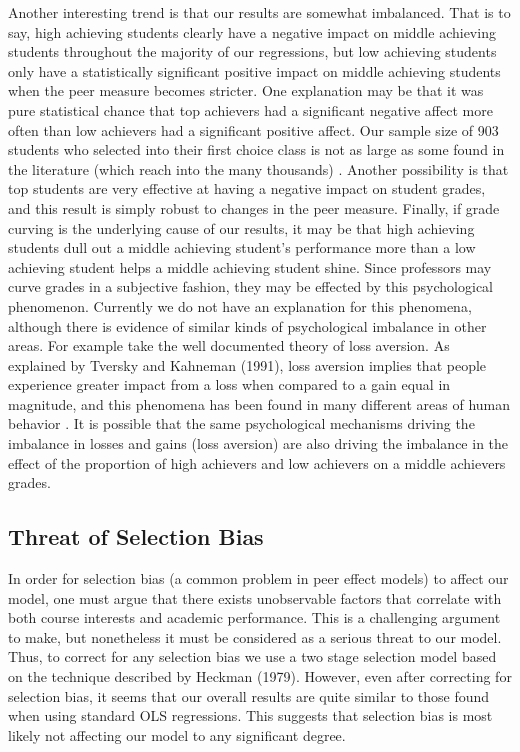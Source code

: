 Another interesting trend is that our results are somewhat imbalanced. That is to say, high achieving students clearly have a negative impact on middle achieving students throughout the majority of our regressions, but low achieving students only have a statistically significant positive impact on middle achieving students when the peer measure becomes stricter. 
One explanation may be that it was pure statistical chance that top achievers had a significant negative affect more often than low achievers had a significant positive affect. 
Our sample size of 903 students who selected into their first choice class is not as large as some found in the literature (which reach into the many thousands) \citep{kang2007classroom,lavy2012good}. 
Another possibility is that top students are very effective at having a negative impact on student grades, and this result is simply robust to changes in the peer measure. 
Finally, if grade curving is the underlying cause of our results, it may be that high achieving students dull out a middle achieving student's performance more than a low achieving student helps a middle achieving student shine. 
Since professors may curve grades in a subjective fashion, they may be effected by this psychological phenomenon. 
Currently we do not have an explanation for this phenomena, although there is evidence of similar kinds of psychological imbalance in other areas. 
For example take the well documented theory of loss aversion. 
As explained by Tversky and Kahneman (1991), loss aversion implies that people experience greater impact from a loss when compared to a gain equal in magnitude, and this phenomena has been found in many different areas of human behavior \citep{shalev2002loss,goette2004loss}. 
It is possible that the same psychological mechanisms driving the imbalance in losses and gains (loss aversion) are also driving the imbalance in the effect of the proportion of high achievers and low achievers on a middle achievers grades. 

\subsection{Threat of Selection Bias}\label{results:tsb}

In order for selection bias (a common problem in peer effect models) to affect our model, one must argue that there exists unobservable factors that correlate with both course interests and academic performance. 
This is a challenging argument to make, but nonetheless it must be considered as a serious threat to our model. 
Thus, to correct for any selection bias we use a two stage selection model based on the technique described by Heckman (1979). 
However, even after correcting for selection bias, it seems that our overall results are quite similar to those found when using standard OLS regressions. 
This suggests that selection bias is most likely not affecting our model to any significant degree. 

